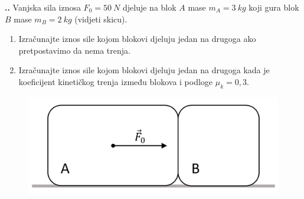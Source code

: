 

\noindent 
\textbf{
\thecjelina.\thezadatak.}
Vanjska sila iznosa $F_0=50\ N$ djeluje na blok $A$ mase $m_A=3\ kg$  koji gura blok 
$B$ mase $m_B=2\ kg$ (vidjeti skicu). 
\begin{enumerate}[label=\alph*)]
 \item Izračunajte iznos sile kojom blokovi djeluju jedan na drugoga ako pretpostavimo da nema trenja.
 \item Izračunajte iznos sile kojom blokovi djeluju jedan na drugoga kada je koeficijent kinetičkog trenja između blokova i podloge $\mu_k =0,3$.
\end{enumerate}


\begin{figure}[h]%
  \begin{center}
    \includegraphics[scale=0.250]{../03_Dinamika_materijalne_tocke/Zadatak_D310.png}
  \end{center}
\end{figure}

